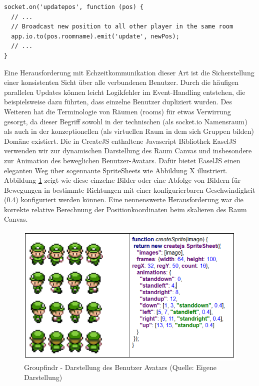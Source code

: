 \begin{verbatim}
socket.on('updatepos', function (pos) { 
  // ... 
  // Broadcast new position to all other player in the same room 
  app.io.to(pos.roomname).emit('update', newPos); 
  // ... 
}
\end{verbatim}

Eine Herausforderung mit Echzeitkommunikation dieser Art ist die Sicherstellung einer konsistenten Sicht über alle verbundenen Benutzer. Durch die häufigen parallelen Updates können leicht Logikfehler im Event-Handling entstehen, die beispielsweise dazu führten, dass einzelne Benutzer dupliziert wurden. Des Weiteren hat die Terminologie von Räumen (rooms) für etwas Verwirrung gesorgt, da dieser Begriff sowohl in der technischen (als socket.io Namensraum) als auch in der konzeptionellen (als virtuellen Raum in dem sich Gruppen bilden) Domäne existiert.
\newline\newline
Die in CreateJS enthaltene Javascript Bibliothek EaselJS verwenden wir zur dynamischen Darstellung des Raum Canvas und insbesondere zur Animation des beweglichen Benutzer-Avatars. Dafür bietet EaselJS einen eleganten Weg über sogennante SpriteSheets wie Abbildung X illustriert. Abbildung \ref{create_sprite} zeigt wie diese einzelne Bilder oder eine Abfolge von Bildern für Bewegungen in bestimmte Richtungen mit einer konfigurierbaren Geschwindigkeit (0.4) konfiguriert werden können. Eine nennenswerte Herausforderung war die korrekte relative Berechnung der Positionkoordinaten beim skalieren des Raum Canvas. 

\begin{figure}[h]
\centering
\includegraphics{graphiken/create_sprite.png}%
\caption{Groupfindr - Darstellung des Benutzer Avatars (Quelle: Eigene Darstellung)}%
\label{create_sprite}%
\end{figure}

